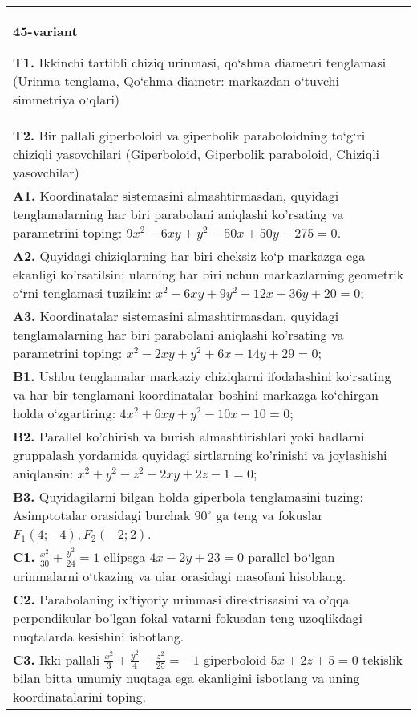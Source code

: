 \documentclass{article}
\begin{document}
\begin{tabular}{m{17cm}}
\textbf{45-variant}
\newline

\textbf{T1.} Ikkinchi tartibli chiziq urinmasi, qo‘shma diametri tenglamasi (Urinma tenglama, Qo‘shma diametr: markazdan o‘tuvchi simmetriya o‘qlari) \\
\textbf{T2.} Bir pallali giperboloid va giperbolik paraboloidning to‘g‘ri chiziqli yasovchilari (Giperboloid, Giperbolik paraboloid, Chiziqli yasovchilar) \\
\textbf{A1.} Koordinatalar sistemasini almashtirmasdan, quyidagi tenglamalarning har biri parabolani aniqlashi ko'rsating va parametrini toping: $9 x^2-6 x y+y^2-50 x+50 y-275=0$. \\
\textbf{A2.} Quyidagi chiziqlarning har biri cheksiz ko‘p markazga ega ekanligi ko'rsatilsin; ularning har biri uchun markazlarning geometrik o‘rni tenglamasi tuzilsin: $x^2-6 x y+9 y^2-12 x+36 y+20=0$; \\
\textbf{A3.} Koordinatalar sistemasini almashtirmasdan, quyidagi tenglamalarning har biri parabolani aniqlashi ko'rsating va parametrini toping: $x^2-2 x y+y^2+6 x-14 y+29=0$; \\
\textbf{B1.} Ushbu tenglamalar markaziy chiziqlarni ifodalashini ko‘rsating va har bir tenglamani koordinatalar boshini markazga ko‘chirgan holda o‘zgartiring: $4 x^2+6 x y+y^2-10 x-10=0$; \\
\textbf{B2.} Parallel ko'chirish va burish almashtirishlari yoki hadlarni gruppalash yordamida quyidagi sirtlarning ko'rinishi va joylashishi aniqlansin: $x^2+y^2-z^2-2 x y+2 z-1=0$; \\
\textbf{B3.} Quyidagilarni bilgan holda giperbola tenglamasini tuzing: Asimptotalar orasidagi burchak $90^{\circ}$ ga teng va fokuslar $F_1 (4;-4), F_2 (-2; 2) $. \\
\textbf{C1.} $\frac{x^2}{30}+\frac{y^2}{24}=1$ ellipsga $4x-2y+23=0$ parallel bo‘lgan urinmalarni o‘tkazing va ular orasidagi masofani hisoblang. \\
\textbf{C2.} Parabolaning ix'tiyoriy urinmasi direktrisasini va o'qqa perpendikular bo'lgan fokal vatarni fokusdan teng uzoqlikdagi nuqtalarda kesishini isbotlang. \\
\textbf{C3.} Ikki pallali $\frac{x^2}{3}+\frac{y^2}{4}-\frac{z^2}{25}=-1$ giperboloid $5 x+2 z+5=0$ tekislik bilan bitta umumiy nuqtaga ega ekanligini isbotlang va uning koordinatalarini toping. \\

\end{tabular}
\vspace{1cm}
\end{document}
